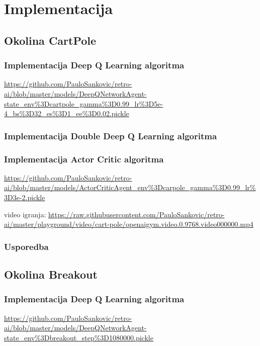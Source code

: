 \chapter{Implementacija}

\section{Okolina CartPole}

\subsection{Implementacija Deep Q Learning algoritma}

\url{https://github.com/PauloSankovic/retro-ai/blob/master/models/DeepQNetworkAgent-state_env\%3Dcartpole_gamma\%3D0.99_lr\%3D5e-4_bs\%3D32_es\%3D1_ee\%3D0.02.pickle}

\subsection{Implementacija Double Deep Q Learning algoritma}

\subsection{Implementacija Actor Critic algoritma}

\url{https://github.com/PauloSankovic/retro-ai/blob/master/models/ActorCriticAgent_env\%3Dcarpole_gamma\%3D0.99_lr\%3D3e-2.pickle}

video igranja:
\url{https://raw.githubusercontent.com/PauloSankovic/retro-ai/master/playground/video/cart-pole/openaigym.video.0.9768.video000000.mp4}

\subsection{Usporedba}

\section{Okolina Breakout}

\subsection{Implementacija Deep Q Learning algoritma}

\url{https://github.com/PauloSankovic/retro-ai/blob/master/models/DeepQNetworkAgent-state_env\%3Dbreakout_step\%3D1080000.pickle}

